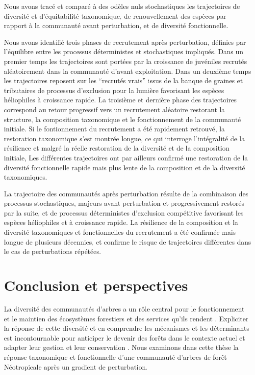 \documentclass[
  11pt,
  french,
  A4paper,
  extrafontsizes,onecolumn,openright
  ]{memoir}
\begin{document}
Nous avons tracé et comparé à des odèles nuls stochastiques les
trajectoires de diversité et d'équitabilité taxonomique, de
renouvellement des espèces par rapport à la communauté avant
perturbation, et de diversité fonctionnelle.

Nous avons identifié trois phases de recrutement après perturbation,
définies par l'équilibre entre les processus déterministes et
stochastiques impliqués. Dans un premier temps les trajectoires sont
portées par la croissance de juvéniles recrutés aléatoirement dans la
communauté d'avant exploitation. Dans un deuxième temps les trajectoires
reposent sur les ``recrutés vrais'' issus de la banque de graines et
tributaires de processus d'exclusion pour la lumière favorisant les
espèces héliophiles à croissance rapide. La troisième et dernière phase
des trajectoires correspond au retour progressif vers un recrutement
aléatoire restorant la structure, la composition taxonomique et le
fonctionnement de la communauté initiale. Si le fontionnement du
recrutement a été rapidement retrouvé, la restoration taxonomique s'est
montrée longue, ce qui interroge l'intégralité de la résilience et
malgré la réelle restoration de la diversité et de la composition
initiale, Les différentes trajectoires ont par ailleurs confirmé une
restoration de la diversité fonctionnelle rapide mais plus lente de la
composition et de la diversité taxonomiques.

La trajectoire des communautés après perturbation résulte de la
combinaison des processus stochastiques, majeurs avant perturbation et
progressivement restorés par la suite, et de processus déterministes
d'exclusion compétitive favorisant les espèces héliophiles et à
croissance rapide. La résilience de la composition et la diversité
taxonomiques et fonctionnelles du recrutement a été confirmée mais
longue de plusieurs décennies, et confirme le risque de trajectoires
différentes dans le cas de perturbations répétées.

\chapter{Conclusion et perspectives}\label{conclusion-et-perspectives}

La diversité des communautés d'arbres a un rôle central pour le
fonctionnement et le maintien des écosystèmes forestiers et des services
qu'ils rendent \autocite{Tilman2014}. Expliciter la réponse de cette
diversité et en comprendre les mécanismes et les déterminants est
incontournable pour anticiper le devenir des forêts dans le contexte
actuel et adapter leur gestion et leur conservation
\autocite{Barlow2018}. Nous examinons dans cette thèse la réponse
taxonomique et fonctionnelle d'une communauté d'arbres de forêt
Néotropicale après un gradient de perturbation.
\end{document}
